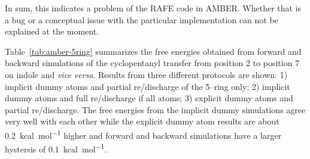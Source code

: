 \documentclass[journal=jctcce,manuscript=suppinfo]{achemso}
\begin{document}
In sum, this indicates a problem of the RAFE code in AMBER.  Whether that is a bug or a conceptual issue with the particular implementation can not be explained at the moment.

Table~\ref{tab:amber-5ring} summarizes the free energies obtained from forward and backward simulations of the cyclopentanyl transfer from position 2 to position 7 on indole and \emph{vice versa}.  Results from three different protocols are shown: 1) implicit dummy atoms and partial re/discharge of the 5--ring only; 2) implicit dummy atoms and full re/discharge if all atoms; 3) explicit dummy atoms and partial re/discharge.  The free energies from the implicit dummy simulations agree very well with each other while the explicit dummy atom results are about \SI{0.2}{kcal.mol^{-1}} higher and forward and backward simulations have a larger hystersis of \SI{0.1}{kcal.mol^{-1}}.
\begin{table}
  \begin{minipage}{\linewidth}
    \caption{Free energies of hydration for the 2--cyclopentanylindole to 7--cyclopentanylindole case with three different protocols.  The data are averages over three runs.}\label{tab:amber-5ring}
  \end{minipage}
\end{table}
\end{document}
